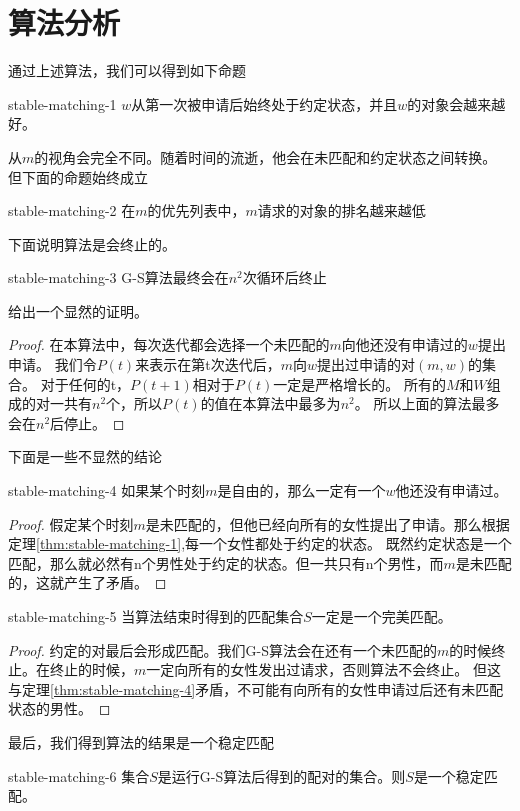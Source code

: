 \section{算法分析}\label{sec:stable-matching-analyze}
通过上述算法，我们可以得到如下命题
\begin{theorem}{}{stable-matching-1}
	$w$从第一次被申请后始终处于约定状态，并且$w$的对象会越来越好。
\end{theorem}
从$m$的视角会完全不同。随着时间的流逝，他会在未匹配和约定状态之间转换。
但下面的命题始终成立
\begin{theorem}{}{stable-matching-2}
	在$m$的优先列表中，$m$请求的对象的排名越来越低
\end{theorem}
下面说明算法是会终止的。
\begin{theorem}{}{stable-matching-3}
	G-S算法最终会在$n^2$次循环后终止
\end{theorem}
给出一个显然的证明。
\begin{proof}
	在本算法中，每次迭代都会选择一个未匹配的$m$向他还没有申请过的$w$提出申请。
	我们令$P(t)$来表示在第t次迭代后，$m$向$w$提出过申请的对$(m,w)$的集合。
	对于任何的t，$P(t+1)$相对于$P(t)$一定是严格增长的。
	所有的$M$和$W$组成的对一共有$n^2$个，所以$P(t)$的值在本算法中最多为$n^2$。
	所以上面的算法最多会在$n^2$后停止。
\end{proof}
下面是一些不显然的结论
\begin{theorem}{}{stable-matching-4}
	如果某个时刻$m$是自由的，那么一定有一个$w$他还没有申请过。
\end{theorem}
\begin{proof}
	假定某个时刻$m$是未匹配的，但他已经向所有的女性提出了申请。那么根据定理\ref{thm:stable-matching-1},每一个女性都处于约定的状态。
	既然约定状态是一个匹配，那么就必然有n个男性处于约定的状态。但一共只有n个男性，而$m$是未匹配的，这就产生了矛盾。
\end{proof}
\begin{theorem}{}{stable-matching-5}
	当算法结束时得到的匹配集合$S$一定是一个完美匹配。
\end{theorem}
\begin{proof}
	约定的对最后会形成匹配。我们G-S算法会在还有一个未匹配的$m$的时候终止。在终止的时候，$m$一定向所有的女性发出过请求，否则算法不会终止。
	但这与定理\ref{thm:stable-matching-4}矛盾，不可能有向所有的女性申请过后还有未匹配状态的男性。
\end{proof}
最后，我们得到算法的结果是一个稳定匹配
\begin{theorem}{}{stable-matching-6}
	集合$S$是运行G-S算法后得到的配对的集合。则$S$是一个稳定匹配。
\end{theorem}
